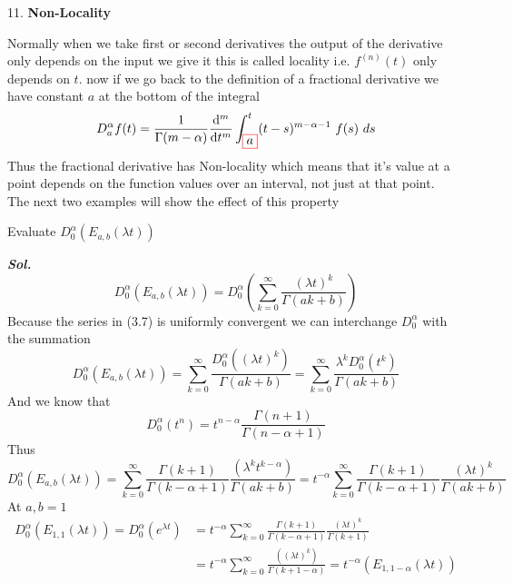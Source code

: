 \newpage
\textcolor{theme}{11.}\textbf{ Non-Locality}

Normally when we take first or second 
derivatives the output of the derivative only depends on the 
input we give it this is called locality i.e. $f^{(n)}(t)$
only depends on $t$. now if we go back to the definition of a fractional derivative we 
have constant $a$ at the bottom of the integral 
\[
    D_{a}^{\alpha} f(t) = \frac{1}{\Gamma(m-\alpha)} \dv[m]{}{t}\int_{\textcolor{red}{\fbox{\textcolor{black}{$a$}}}}^{t} (t-s)^{m - \alpha -1} \,\, f(s) \,\, ds
\]
Thus the fractional derivative has Non-locality which means 
that it's value at a point depends on the function values over an interval, 
not just at that point.
\\
The next two examples will show the effect of this property
\vspace*{-.4cm}
\begin{example}
    Evaluate $\displaystyle D_{0}^{\alpha} (E_{a,b}(\lambda t))$

    \textit{ \textbf{Sol.} }
    \begin{equation}
        D_{0}^{\alpha} (E_{a,b}(\lambda t)) = D_{0}^{\alpha} \left(\sum_{k=0}^{\infty}\frac{{(\lambda t)}^k}{\Gamma(a k + b )}\right)
    \end{equation}
    Because the series in (3.7) is uniformly convergent we can interchange $D_{0}^{\alpha}$ with the summation
    \[
        D_{0}^{\alpha} (E_{a,b}(\lambda t)) = \sum_{k=0}^{\infty}\frac{D_{0}^{\alpha} ((\lambda t)^k)}{\Gamma(a k + b )} = \sum_{k=0}^{\infty}\frac{\lambda^k D_{0}^{\alpha} (t^k)}{\Gamma(a k + b )}
    \]
    And we know that 
    \[
        D_{0}^{\alpha} (t^n) = t^{n-\alpha}\frac{\Gamma{(n+1)} } {\Gamma{(n-\alpha+1)} }    
    \]
    Thus 
    \[
        D_{0}^{\alpha} (E_{a,b}(\lambda t)) = \sum_{k=0}^{\infty}\frac{\Gamma{(k+1)} } {\Gamma{(k-\alpha+1)} } \frac{(\lambda^k t^{k-\alpha})}{\Gamma(a k + b )} = t^{-\alpha} \sum_{k=0}^{\infty}\frac{\Gamma{(k+1)} } {\Gamma{(k-\alpha+1)} } \frac{({\lambda t})^k}{\Gamma(a k + b )}
    \]
    At $a,b = 1$ 
    \begin{align*}
        D_{0}^{\alpha} (E_{1,1}(\lambda t)) = D_{0}^{\alpha} (e^{\lambda t}) &= t^{-\alpha} \sum_{k=0}^{\infty}\frac{\Gamma{(k+1)} } {\Gamma{(k-\alpha+1)} } \frac{(\lambda t)^{k}}{\Gamma(k + 1 )}
        \\
        & = t^{-\alpha} \sum_{k=0}^{\infty} \frac{((\lambda t)^{k})}{\Gamma(k+1-\alpha)} = t^{-\alpha} (E_{1,1-\alpha}(\lambda t))
    \end{align*}
\end{example}
